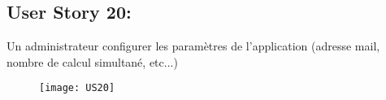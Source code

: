 \newpage
\subsection{User Story 20:}
Un administrateur configurer les paramètres de l'application (adresse mail, nombre de calcul simultané, etc...)


\begin{figure}[!h]
  \begin{center}
        \texttt{[image: US20]}
        \label{US20-dia}
  \end{center}
\end{figure}